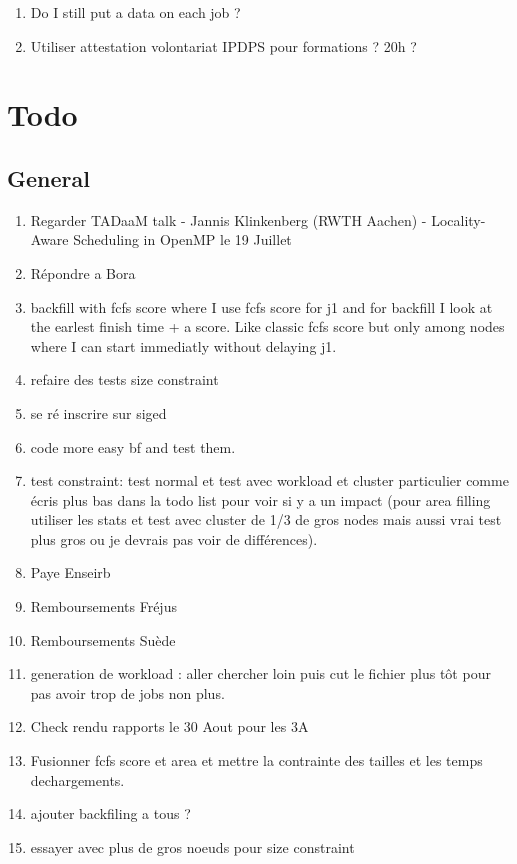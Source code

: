 \documentclass[a4paper]{article}
\begin{document}
	\begin{enumerate}
		\item Do I still put a data on each job ?
		\item Utiliser attestation volontariat IPDPS pour formations ? 20h ?
	\end{enumerate}

\section{Todo}
	\subsection{General}
		\begin{enumerate}
			\item Regarder TADaaM talk - Jannis Klinkenberg (RWTH Aachen) - Locality-Aware Scheduling in OpenMP le 19 Juillet
			\item Répondre a Bora
			\item backfill with fcfs score where I use fcfs score for j1 and for backfill I look at the earlest finish time + a score. Like classic fcfs score but only among nodes where I can start immediatly without delaying j1.
			\item refaire des tests size constraint
			\item se ré inscrire sur siged
			\item code more easy bf and test them.
			\item test constraint: test normal et test avec workload et cluster particulier comme écris plus bas dans la todo list pour voir si y a un impact (pour area filling utiliser les stats et test avec cluster de 1/3 de gros nodes mais aussi vrai test plus gros ou je devrais pas voir de différences).
			\item Paye Enseirb
			\item Remboursements Fréjus
			\item Remboursements Suède
			\item generation de workload : aller chercher loin puis cut le fichier plus tôt pour pas avoir trop de jobs non plus.
			\item Check rendu rapports le 30 Aout pour les 3A
			\item Fusionner fcfs score et area et mettre la contrainte des tailles et les temps dechargements.
			\item ajouter backfiling a tous ?
			\item essayer avec plus de gros noeuds pour size constraint

\end{enumerate}
\end{document}
